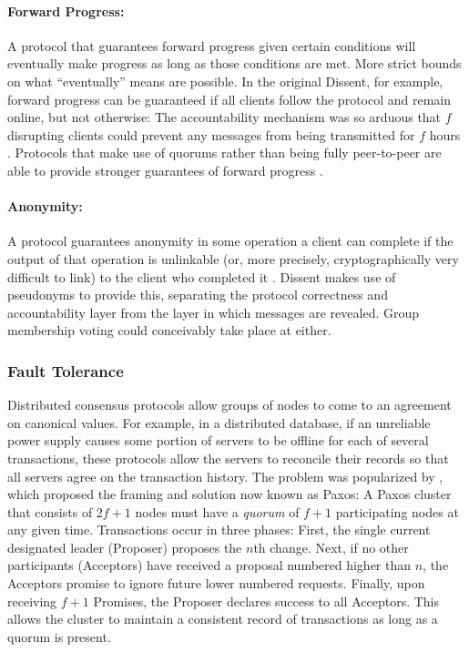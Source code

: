     \paragraph{Forward Progress:} A protocol that guarantees forward progress
    given certain conditions will eventually make progress as long as those
    conditions are met. More strict bounds on what ``eventually'' means are
    possible. In the original Dissent, for example, forward progress can be
    guaranteed if all clients follow the protocol and remain online, but not
    otherwise: The accountability mechanism was so arduous that $f$ disrupting
    clients could prevent any messages from being transmitted for $f$ hours
    \cite{corrigan-gibbs_proactively_2013}. Protocols that make use of quorums
    rather than being fully peer-to-peer are able to provide stronger guarantees
    of forward progress \cite{lamport_part-time_1998}.
    \paragraph{Anonymity:} A protocol guarantees anonymity in some operation a
    client can complete if the output of that operation is unlinkable (or, more
    precisely, cryptographically very difficult to link) to the client who
    completed it \cite{corrigan-gibbs_dissent:_2010}. Dissent makes use of
    pseudonyms to provide this, separating the protocol correctness and
    accountability layer from the layer in which messages are revealed. Group
    membership voting could conceivably take place at either.

  \subsubsection{Fault Tolerance}
    Distributed consensus protocols allow groups of nodes to come to an
    agreement on canonical values. For example, in a distributed database, if an
    unreliable power supply causes some portion of servers to be offline for
    each of several transactions, these protocols allow the
    servers to reconcile their records so that all servers agree on the
    transaction history. The problem was popularized by
    \cite{lamport_part-time_1998}, which proposed the framing and solution now
    known as Paxos: A Paxos cluster that consists of 2$f+1$ nodes must have a
    \emph{quorum} of $f + 1$ participating nodes at any given time.
    Transactions occur in three phases: First, the single current designated
    leader (Proposer) proposes the $n$th change. Next, if no other participants
    (Acceptors) have received a proposal numbered higher than $n$, the Acceptors
    promise to ignore future lower numbered requests.  Finally, upon receiving
    $f+1$ Promises, the Proposer declares success to all Acceptors. This allows
    the cluster to maintain a consistent record of transactions as long as a
    quorum is present.

